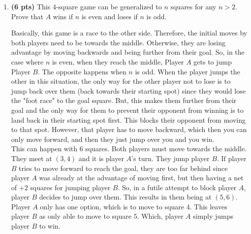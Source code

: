 \documentclass{article}
\begin{document}
\begin{enumerate}
\begin{enumerate}[label=($\alph*$)]


    \item \textbf{(6 pts)} This 4-square game can be generalized to $n$ squares for any $n > 2$. Prove that $A$ wins if $n$ is even and loses if $n$ is odd.

    \color{blue}
        Basically, this game is a race to the other side. Therefore, the initial moves by both players need to be towards the middle. Otherwise, they are losing advantage by moving backwards and being further from their goal. So, in the case where $n$ is even, when they reach the middle, Player $A$ gets to jump Player $B$. The opposite happens when $n$ is odd. When the player jumps the other in this situation, the only way for the other player not to lose is to jump back over them (back towards their starting spot) since they would lose the "foot race" to the goal square. But, this makes them further from their goal and the only way for them to prevent their opponent from winning is to land back in their starting spot first. This blocks their opponent from moving to that spot. However, that player has to move backward, which then you can only move forward, and then they just jump over you and you win.\\

        This can happen with 6 squares. Both players must move towards the middle. They meet at $(3,4)$ and it is player $A$'s turn. They jump player $B$. If player $B$ tries to move forward to reach the goal, they are too far behind since player $A$ was already at the advantage of moving first, but then having a net of $+2$ squares for jumping player $B$. So, in a futile attempt to block player $A$, player $B$ decides to jump over them. This results in them being at $(5,6)$. Player $A$ only has one option, which is to move to square 4. This leaves player $B$ as only able to move to square $5$. Which, player $A$ simply jumps player $B$ to win.
    \color{black}

    
    \end{enumerate}




\end{enumerate}
\end{document}
